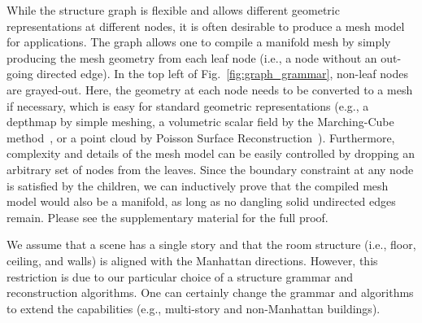  While the structure graph is flexible
and allows different geometric representations at different nodes, it is
often desirable to produce a mesh model for applications.
The graph allows one to compile a manifold mesh by simply producing the
mesh geometry from each leaf node (i.e., a node without an out-going
directed edge). In the top left of Fig.~\ref{fig:graph_grammar},
non-leaf nodes are grayed-out. Here, the geometry at each node needs to
be converted to a mesh if necessary, which is easy for standard
geometric representations (e.g., a depthmap by simple meshing, a
volumetric scalar field by the Marching-Cube method~\cite{MarchingCube},
or a point cloud by Poisson Surface
Reconstruction~\cite{shan2014occluding}). Furthermore,
complexity and details of the mesh model can be easily controlled by dropping an arbitrary set of nodes from the
leaves. Since the boundary constraint at any node is satisfied by the
children, we can inductively prove that the compiled mesh model would
also be a manifold, as long as no dangling solid undirected edges
remain. Please see the supplementary material for the full proof.


 We assume that a scene has a single story
and that the room structure (i.e., floor, ceiling, and walls) is aligned
with the Manhattan directions. However, this restriction is due to our
particular choice of a structure grammar and reconstruction
algorithms. One can certainly change the grammar and algorithms to
extend the capabilities (e.g., multi-story and non-Manhattan buildings).
%



